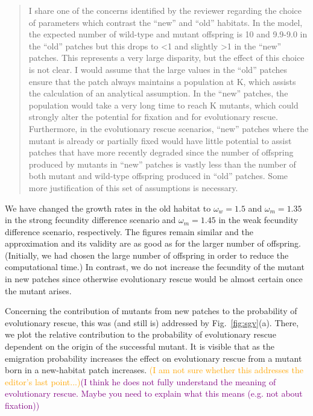 \documentclass[11pt]{article}
\newenvironment{referee}{\vspace{0.cm} \sffamily \color{colreferee} \begin{quotation} }{\end{quotation} \vspace{0.cm}}
\newcommand{\lmarginpar}[1]{\reversemarginpar\marginpar{\textcolor{colreferee}{\textbf{\textsf{[#1]}}}}}
\newcommand{\addnb}[1]{\refstepcounter{numcom}\lmarginpar{\arabic{numcom}}\label{#1}}
\newcommand{\florence}[1]{\textcolor{purple}{(#1)}}
\newcommand{\pete}[1]{\textcolor{orange}{(#1)}}
\newcounter{numcom}
\begin{document}
\begin{referee} 
I \addnb{AE4}share one of the concerns identified by the reviewer regarding the choice of parameters which contrast the “new” and “old” habitats.   In the model, the expected number of wild-type and mutant offspring is 10 and 9.9-9.0 in the “old” patches but this drops to <1 and slightly >1 in the “new” patches.   This represents a very large disparity, but the effect of this choice is not clear. I would assume that the large values in the “old” patches ensure that the patch always maintains a population at K, which assists the calculation of an analytical assumption. In the “new” patches, the population would take a very long time to reach K mutants, which could strongly alter the potential for fixation and for evolutionary rescue.   Furthermore, in the evolutionary rescue scenarios, “new” patches where the mutant is already or partially fixed would have little potential to assist patches that have more recently degraded since the number of offspring produced by mutants in “new”
patches is vastly less than the number of both mutant and wild-type offspring produced in “old” patches. Some more justification of this set of assumptions is necessary.    
\end{referee}
%
We have changed the growth rates in the old habitat to $\omega_w=1.5$ and $\omega_m=1.35$ in the strong fecundity difference scenario and $\omega_m=1.45$ in the weak fecundity difference scenario, respectively. The figures remain similar and the approximation and its validity are as good as for the larger number of offspring. (Initially, we had chosen the large number of offspring in order to reduce the computational time.) In contrast, we do not increase the fecundity of the mutant in new patches since otherwise evolutionary rescue would be almost certain once the mutant arises. 

Concerning the contribution of mutants from new patches to the probability of evolutionary rescue, this was (and still is) addressed by Fig.~\ref{fig:sgv}(a). There, we plot the relative contribution to the probability of evolutionary rescue dependent on the origin of the successful mutant. It is visible that as the emigration probability increases the effect on evolutionary rescue from a mutant born in a new-habitat patch increases.
\pete{I am not sure whether this addresses the editor's last point...}\florence{I think he does not fully understand the meaning of evolutionary rescue. Maybe you need to explain what this means (e.g. not about fixation)}
\end{document}
